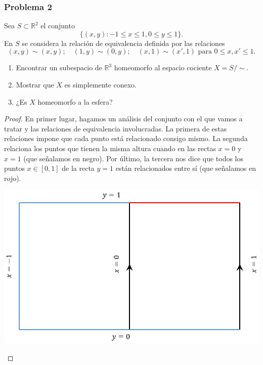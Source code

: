\begin{itemize}
\subsubsection{Problema 2}
Sea $S\subset \mathbb{R}^2$ el conjunto
\begin{equation}
	\{(x,y): -1 \leq x\leq 1, 0\leq y \leq 1\}.
\end{equation}
En $S$ se considera la relación de equivalencia definida por las relaciones
\[(x,y)\sim (x,y); \quad (1,y)\sim (0,y); \quad (x,1)\sim (x',1) \text{ para } 0\leq x,x'\leq 1.\] 
\begin{enumerate}
	\item Encontrar un subespacio de $\mathbb{R}^3$ homeomorfo al espacio cociente $X=S/\sim$.
	\item Mostrar que $X$ es simplemente conexo.
	\item ¿Es $X$ homeomorfo a la esfera?
\end{enumerate}
\begin{proof}
	
	En primer lugar, hagamos un análisis del conjunto con el que vamos a tratar y las relaciones de equivalencia involucradas. La primera de estas relaciones impone que cada punto está relacionado consigo mismo. La segunda relaciona los puntos que tienen la misma altura cuando en las rectas $x=0$ y $x=1$ (que señalamos en negro). Por último, la tercera nos dice que todos los puntos $x\in[0,1]$ de la recta $y=1$ están relacionados entre sí (que señalamos en rojo).
		\begin{center}
			\includegraphics[scale=0.5]{img/ExamenSeptiembre2017/Ex2007imagen1.png} 
		\end{center}
	

\end{proof}
\end{itemize}
